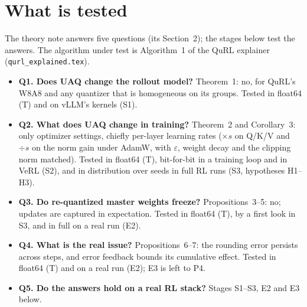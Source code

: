 \documentclass[11pt]{article}
\begin{document}
\tableofcontents

\section{What is tested}\label{sec:tested}
The theory note answers five questions (its Section~2); the stages below test the answers. The algorithm under test is Algorithm~1 of the QuRL explainer (\texttt{qurl\_explained.tex}).
\begin{itemize}
\item \textbf{Q1. Does UAQ change the rollout model?} Theorem~1: no, for QuRL's W8A8 and any quantizer that is homogeneous on its groups. Tested in float64 (T) and on vLLM's kernels (S1).
\item \textbf{Q2. What does UAQ change in training?} Theorem~2 and Corollary~3: only optimizer settings, chiefly per-layer learning rates ($\times s$ on Q/K/V and $\div s$ on the norm gain under AdamW, with $\varepsilon$, weight decay and the clipping norm matched). Tested in float64 (T), bit-for-bit in a training loop and in VeRL (S2), and in distribution over seeds in full RL runs (S3, hypotheses H1--H3).
\item \textbf{Q3. Do re-quantized master weights freeze?} Propositions~3--5: no; updates are captured in expectation. Tested in float64 (T), by a first look in S3, and in full on a real run (E2).
\item \textbf{Q4. What is the real issue?} Propositions~6--7: the rounding error persists across steps, and error feedback bounds its cumulative effect. Tested in float64 (T) and on a real run (E2); E3 is left to P4.
\item \textbf{Q5. Do the answers hold on a real RL stack?} Stages S1--S3, E2 and E3 below.
\end{itemize}
\end{document}
